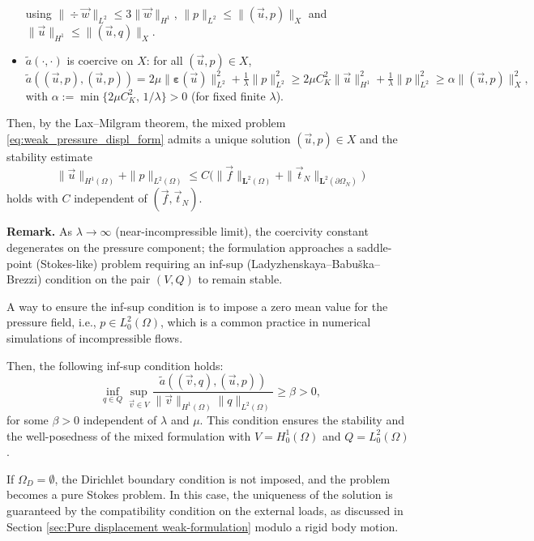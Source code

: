 \documentclass[a4paper,12pt,twoside]{report}
\begin{document}
\begin{itemize}
	using $\|\div \vec w\|_{L^2}\le 3 \|\vec w\|_{H^1}$, $\|p\|_{L^2} \le \|(\vec u,p)\|_X$ and $\|\vec u\|_{H^1} \le \|(\vec u,q)\|_X$.
	\item $\tilde a(\cdot,\cdot)$ is coercive on $X$: for all $(\vec u,p)\in X$,
	\begin{equation*}
		\tilde a((\vec u,p),(\vec u,p)) = 2\mu \|\boldsymbol{\varepsilon}(\vec u)\|_{L^2}^2 + \tfrac{1}{\lambda}\|p\|_{L^2}^2
		\ge 2\mu C_K^2 \|\vec u\|_{H^1}^2 + \tfrac{1}{\lambda}\|p\|_{L^2}^2
		\ge \alpha \|(\vec u,p)\|_X^2,
	\end{equation*}
	with $\alpha:=\min\{2\mu C_K^2,\,1/\lambda\}>0$ (for fixed finite $\lambda$).
\end{itemize}

Then, by the Lax–Milgram theorem, the mixed problem \eqref{eq:weak_pressure_displ_form} admits a unique solution $(\vec u,p)\in X$ and the stability estimate
\[
\|\vec u\|_{H^1(\Omega)}+\|p\|_{L^2(\Omega)} \le C\big(\|\vec f\|_{\boldsymbol L^2(\Omega)} + \|\vec t_N\|_{\boldsymbol L^2(\partial\Omega_N)}\big)
\]
holds with $C$ independent of $(\vec f,\vec t_N)$.

\noindent \textbf{Remark.} As $\lambda\to \infty$ (near-incompressible limit), the coercivity constant degenerates on the pressure component; the formulation approaches a saddle-point (Stokes-like) problem requiring an inf-sup (Ladyzhenskaya–Babuška–Brezzi) condition on the pair $(V,Q)$ to remain stable.

A way to ensure the inf-sup condition is to impose a zero mean value for the pressure field, i.e., $p\in L^2_0(\Omega)$, which is a common practice in numerical simulations of incompressible flows.

Then, the following inf-sup condition holds:
\[\inf_{q\in Q}\sup_{\vec v\in V}\frac{\tilde a((\vec v,q),(\vec u,p))}{\|\vec v\|_{H^1(\Omega)}\|q\|_{L^2(\Omega)}} \ge \beta > 0,\]
for some $\beta>0$ independent of $\lambda$ and $\mu$. This condition ensures the stability and the well-posedness of the mixed formulation with $V = H^1_0(\Omega)$ and $Q = L^2_0(\Omega)$ \cite{boffi_mixed_2008}.

If $\Omega_D = \emptyset$, the Dirichlet boundary condition is not imposed, and the problem becomes a pure Stokes problem. In this case, the uniqueness of the solution is guaranteed by the compatibility condition on the external loads, as discussed in Section \ref{sec:Pure displacement weak-formulation} modulo a rigid body motion.
\end{document}
